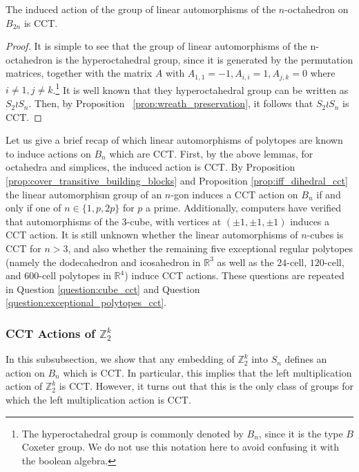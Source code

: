 \documentclass[smallextended, envcountsame, numbook]{svjour3}
\numberwithin{equation}{section}
\newcommand\sssec{\subsubsection}
\begin{document}
\begin{proposition}
The induced action of the group of linear automorphisms of the $n$-octahedron on $B_{2n}$ is CCT.
\end{proposition}
\begin{proof}
It is simple to see that the group of linear automorphisms of the n-octahedron is the hyperoctahedral group, since it is generated by the permutation matrices, together with the matrix $A$ with $A_{1,1} = -1,A_{i,i} = 1,A_{j,k} = 0$ where $i \neq 1, j \neq k$.\footnote{The hyperoctahedral group is commonly denoted by $B_n$, since it is the type $B$ Coxeter group. We do not use this notation here to avoid confusing it with the boolean algebra.} It is well known that they hyperoctahedral group can be written as $S_2 \wr S_n$. Then, by Proposition ~\ref{prop:wreath_preservation}, it follows that $S_2 \wr S_n$ is CCT.
\end{proof}

\begin{remark}
Let us give a brief recap of which linear automorphisms of polytopes are known to induce actions on $B_n$ which are CCT. First, by the above lemmas, for octahedra and simplices, the induced action is CCT. By Proposition  \ref{prop:cover_transitive_building_blocks} and Proposition \ref{prop:iff_dihedral_cct} the linear automorphism group of an $n$-gon induces a CCT action on $B_n$ if and only if one of $n\in \{1,p,2p\}$ for $p$ a prime. Additionally, computers have verified that automorphisms of the 3-cube, with vertices at $(\pm 1,\pm 1,\pm 1)$ induces a CCT action. It is still unknown whether the linear automorphisms of $n$-cubes is CCT for $n> 3$, and also whether the remaining five exceptional regular polytopes (namely the dodecahedron and icosahedron in $\mathbb R^3$ as well as the $24$-cell, $120$-cell, and $600$-cell polytopes in $\mathbb R^4$) induce CCT actions. These questions are repeated in Question \ref{question:cube_cct} and Question \ref{question:exceptional_polytopes_cct}.

\end{remark}

\sssec{CCT Actions of $\mathbb Z_2^k$}

In this subsubsection, we show that any embedding of $\mathbb Z_2^k$ into $S_n$ defines an action on $B_n$ which is CCT. In particular, this implies that the left multiplication action of $\mathbb Z_2^k$ is CCT. However, it turns out that this is the only class of groups for which the left multiplication action is CCT.
\end{document}
